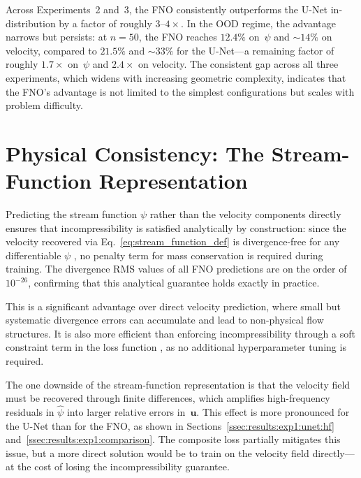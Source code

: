 Across Experiments~2 and~3, the FNO consistently outperforms the U-Net in-distribution by a factor of roughly $3$–$4\times$. In the OOD regime, the advantage narrows but persists: at $n = 50$, the FNO reaches $12.4\%$ on~$\psi$ and ${\sim}14\%$ on velocity, compared to $21.5\%$ and ${\sim}33\%$ for the U-Net—a remaining factor of roughly $1.7\times$ on~$\psi$ and $2.4\times$ on velocity. The consistent gap across all three experiments, which widens with increasing geometric complexity, indicates that the FNO's advantage is not limited to the simplest configurations but scales with problem difficulty.

\section{Physical Consistency: The Stream-Function Representation}

Predicting the stream function $\psi$ rather than the velocity components directly ensures that incompressibility is satisfied analytically by construction: since the velocity recovered via Eq.~\ref{eq:stream_function_def} is divergence-free for any differentiable $\psi$ \parencite{richter-powell_neural_2022}, no penalty term for mass conservation is required during training. The divergence RMS values of all FNO predictions are on the order of $10^{-26}$, confirming that this analytical guarantee holds exactly in practice.

This is a significant advantage over direct velocity prediction, where small but systematic divergence errors can accumulate and lead to non-physical flow structures. It is also more efficient than enforcing incompressibility through a soft constraint term in the loss function \parencite{zhu_physics-constrained_2019}, as no additional hyperparameter tuning is required.

The one downside of the stream-function representation is that the velocity field must be recovered through finite differences, which amplifies high-frequency residuals in $\hat\psi$ into larger relative errors in~$\mathbf{u}$. This effect is more pronounced for the U-Net than for the FNO, as shown in Sections~\ref{ssec:results:exp1:unet:hf} and~\ref{ssec:results:exp1:comparison}. The composite loss partially mitigates this issue, but a more direct solution would be to train on the velocity field directly—at the cost of losing the incompressibility guarantee.

